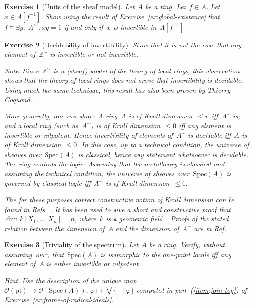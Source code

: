 \documentclass{ws-rv9x6}
\newtheorem{ex}{Exercise}
\newenvironment{exercise}[1]{
  \begin{ex}[#1]
}{\end{ex}}
\renewcommand{\O}{\mathcal{O}}
\newcommand{\ZZ}{\mathbb{Z}}
\newcommand{\Spec}{\mathrm{Spec}}
\renewcommand{\_}{\mathpunct{.}}
\newcommand{\?}{\,{:}\,}
\newcommand{\pt}{\mathrm{pt}}
\newcommand{\BPIT}{\textsc{bpit}\xspace}
\begin{document}
\begin{exercise}{Units of the sheaf model}%
Let~$A$ be a ring. Let~$f \in A$. Let~$x \in A[f^{-1}]$. Show using the result
of Exercise~\ref{ex:global-existence} that~$f \models \exists y\?A^\sim\_ xy
= 1$ if and only if~$x$ is invertible in~$A[f^{-1}]$.
\end{exercise}

\begin{exercise}{Decidability of invertibility}
Show that it is not the case that any element of~$\ZZ^\sim$ is invertible or
not invertible.\smallskip

{\noindent\scriptsize\emph{Note.} Since~$\ZZ^\sim$ is a (sheaf) model of the
theory of local rings, this observation shows that the theory of
local rings does not prove that invertibility is decidable. Using much the same
technique, this result has also been proven by Thierry
Coquand~\cite{coquand:local-rings}.

More generally, one can show: A ring~$A$ is of Krull dimension~$\leq n$
iff~$A^\sim$ is; and a local ring (such as~$A^\sim$) is of Krull
dimension~$\leq 0$ iff any element is invertible or nilpotent. Hence
invertibility of elements of~$A^\sim$ is decidable iff~$A$ is of Krull
dimension~$\leq 0$. In this case, up to a technical condition, the universe of
sheaves over~$\Spec(A)$ is classical, hence any statement whatsoever is
decidable. \emph{The ring controls the logic:} Assuming that the metatheory is
classical and assuming the technical condition, the universe of sheaves
over~$\Spec(A)$ is governed by classical logic iff~$A^\sim$ is of Krull
dimension~$\leq 0$.

The for these purposes correct constructive notion of Krull dimension can be
found in Refs.~.
It has been used to give a short and constructive proof that~$\dim
k[X_1,\ldots,X_n] = n$, where~$k$ is a geometric
field~\cite{coquand-lombardi:krull-dim-polynomial-ring}. Proofs of the stated
relation between the dimension of~$A$ and the dimension of~$A^\sim$ are in
Ref.~\cite[Section~3.4]{blechschmidt:phd}.\par}
\end{exercise}

\begin{exercise}{Triviality of the spectrum}%
Let~$A$ be a ring. Verify, without assuming~\BPIT, that~$\Spec(A)$ is
isomorphic to the one-point locale iff any element of~$A$ is either
invertible or nilpotent.\smallskip

{\noindent\scriptsize\emph{Hint.} Use the description of the unique map~$\O(\pt) \to
\O(\Spec(A)),\,\varphi \mapsto \bigvee\{\top\,|\,\varphi\}$ computed in
part~(\ref{item:join-top}) of Exercise~\ref{ex:frame-of-radical-ideals}.\par}
\end{exercise}
\end{document}
